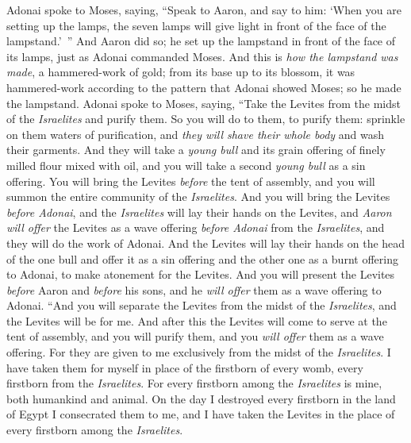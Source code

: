 \begin{biblechapter} %
 Adonai spoke to Moses, saying,
\verse “Speak to Aaron, and say to him: ‘When you are setting up the lamps, the seven lamps will give light in front of the face of the lampstand.’ ”
\verse And Aaron did so; he set up the lampstand in front of the face of its lamps, just as Adonai commanded Moses.
\verse And this is \textit{how the lampstand was made}, a hammered-work of gold; from its base up to its blossom, it was hammered-work according to the pattern that Adonai showed Moses; so he made the lampstand.
 Adonai spoke to Moses, saying,
\verse “Take the Levites from the midst of the \textit{Israelites} and purify them.
\verse So you will do to them, to purify them: sprinkle on them waters of purification, and \textit{they will shave their whole body} and wash their garments.
\verse And they will take a \textit{young bull} and its grain offering of finely milled flour mixed with oil, and you will take a second \textit{young bull} as a sin offering.
\verse You will bring the Levites \textit{before} the tent of assembly, and you will summon the entire community of the \textit{Israelites}.
\verse And you will bring the Levites \textit{before Adonai}, and the \textit{Israelites} will lay their hands on the Levites,
\verse and \textit{Aaron will offer} the Levites as a wave offering \textit{before Adonai} from the \textit{Israelites}, and they will do the work of Adonai.
\verse And the Levites will lay their hands on the head of the one bull and offer it as a sin offering and the other one as a burnt offering to Adonai, to make atonement for the Levites.
\verse And you will present the Levites \textit{before} Aaron and \textit{before} his sons, and he \textit{will offer} them as a wave offering to Adonai.
\verse “And you will separate the Levites from the midst of the \textit{Israelites}, and the Levites will be for me.
\verse And after this the Levites will come to serve at the tent of assembly, and you will purify them, and you \textit{will offer} them as a wave offering.
\verse For they are given to me exclusively from the midst of the \textit{Israelites}. I have taken them for myself in place of the firstborn of every womb, every firstborn from the \textit{Israelites}.
\verse For every firstborn among the \textit{Israelites} is mine, both humankind and animal. On the day I destroyed every firstborn in the land of Egypt I consecrated them to me,
\verse and I have taken the Levites in the place of every firstborn among the \textit{Israelites}.

\end{biblechapter}
